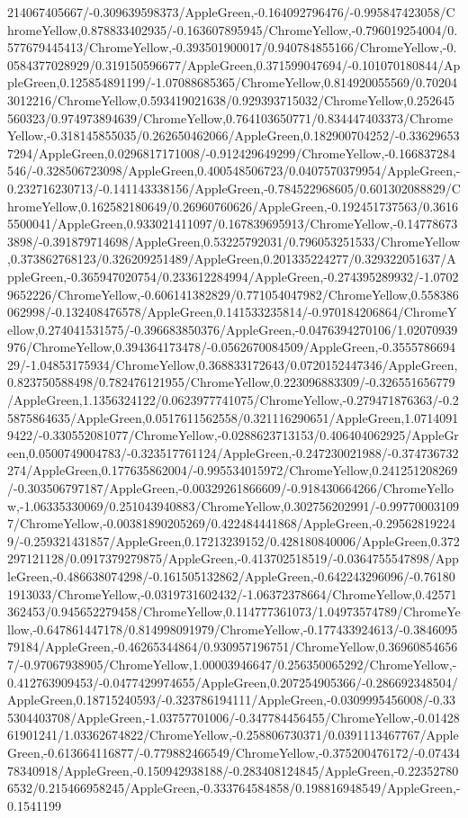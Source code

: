 {\begin{tikzternal}
214067405667/-0.309639598373/AppleGreen,-0.164092796476/-0.995847423058/ChromeYellow,0.878833402935/-0.163607895945/ChromeYellow,-0.796019254004/0.577679445413/ChromeYellow,-0.393501900017/0.940784855166/ChromeYellow,-0.0584377028929/0.319150596677/AppleGreen,0.371599047694/-0.101070180844/AppleGreen,0.125854891199/-1.07088685365/ChromeYellow,0.814920055569/0.702043012216/ChromeYellow,0.593419021638/0.929393715032/ChromeYellow,0.252645560323/0.974973894639/ChromeYellow,0.764103650771/0.834447403373/ChromeYellow,-0.318145855035/0.262650462066/AppleGreen,0.182900704252/-0.336296537294/AppleGreen,0.0296817171008/-0.912429649299/ChromeYellow,-0.166837284546/-0.328506723098/AppleGreen,0.400548506723/0.0407570379954/AppleGreen,-0.232716230713/-0.141143338156/AppleGreen,-0.784522968605/0.601302088829/ChromeYellow,0.162582180649/0.26960760626/AppleGreen,-0.192451737563/0.36165500041/AppleGreen,0.933021411097/0.167839695913/ChromeYellow,-0.147786733898/-0.391879714698/AppleGreen,0.53225792031/0.796053251533/ChromeYellow,0.373862768123/0.326209251489/AppleGreen,0.201335224277/0.329322051637/AppleGreen,-0.365947020754/0.233612284994/AppleGreen,-0.274395289932/-1.07029652226/ChromeYellow,-0.606141382829/0.771054047982/ChromeYellow,0.558386062998/-0.132408476578/AppleGreen,0.141533235814/-0.970184206864/ChromeYellow,0.274041531575/-0.396683850376/AppleGreen,-0.0476394270106/1.02070939976/ChromeYellow,0.394364173478/-0.0562670084509/AppleGreen,-0.355578669429/-1.04853175934/ChromeYellow,0.368833172643/0.0720152447346/AppleGreen,0.823750588498/0.782476121955/ChromeYellow,0.223096883309/-0.326551656779/AppleGreen,1.1356324122/0.0623977741075/ChromeYellow,-0.279471876363/-0.25875864635/AppleGreen,0.0517611562558/0.321116290651/AppleGreen,1.07140919422/-0.330552081077/ChromeYellow,-0.0288623713153/0.406404062925/AppleGreen,0.0500749004783/-0.323517761124/AppleGreen,-0.247230021988/-0.374736732274/AppleGreen,0.177635862004/-0.995534015972/ChromeYellow,0.241251208269/-0.303506797187/AppleGreen,-0.00329261866609/-0.918430664266/ChromeYellow,-1.06335330069/0.251043940883/ChromeYellow,0.302756202991/-0.997700031097/ChromeYellow,-0.00381890205269/0.422484441868/AppleGreen,-0.295628192249/-0.259321431857/AppleGreen,0.17213239152/0.428180840006/AppleGreen,0.372297121128/0.0917379279875/AppleGreen,-0.413702518519/-0.0364755547898/AppleGreen,-0.486638074298/-0.161505132862/AppleGreen,-0.642243296096/-0.761801913033/ChromeYellow,-0.0319731602432/-1.06372378664/ChromeYellow,0.42571362453/0.945652279458/ChromeYellow,0.114777361073/1.04973574789/ChromeYellow,-0.647861447178/0.814998091979/ChromeYellow,-0.177433924613/-0.384609579184/AppleGreen,-0.46265344864/0.930957196751/ChromeYellow,0.369608546567/-0.97067938905/ChromeYellow,1.00003946647/0.256350065292/ChromeYellow,-0.412763909453/-0.0477429974655/AppleGreen,0.207254905366/-0.286692348504/AppleGreen,0.18715240593/-0.323786194111/AppleGreen,-0.0309995456008/-0.335304403708/AppleGreen,-1.03757701006/-0.347784456455/ChromeYellow,-0.0142861901241/1.03362674822/ChromeYellow,-0.258806730371/0.0391113467767/AppleGreen,-0.613664116877/-0.779882466549/ChromeYellow,-0.375200476172/-0.0743478340918/AppleGreen,-0.150942938188/-0.283408124845/AppleGreen,-0.223527806532/0.215466958245/AppleGreen,-0.333764584858/0.198816948549/AppleGreen,-0.1541199
\end{tikzternal}}

